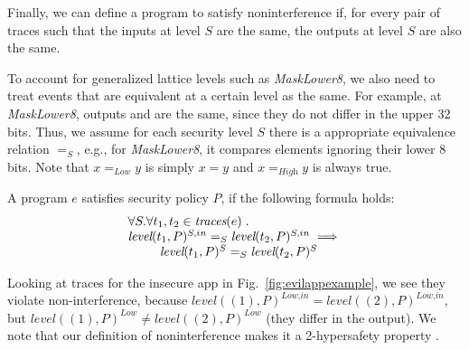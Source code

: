 \documentclass[10pt,conference,compsocconf]{IEEEtran}
\newcommand{\code}[1]{\text{\lstinline!#1!}}
\newcommand{\traces}{\textit{traces}}
\newcommand{\tr}{t\xspace}
\newcommand{\tset}{\ensuremath{\mathcal{T}}\xspace}
\newcommand{\tleveltr}[2]{\textit{level}(#1, #2)}
\begin{document}
Finally, we can define a program to satisfy noninterference if, for
every pair of traces such that the inputs at level $S$ are the same,
the outputs at level $S$ are also the same.

To account for generalized lattice levels such as \textit{MaskLower8},
we also need to treat events that are equivalent at a certain level as
the same. For example, at \textit{MaskLower8}, outputs
\code{0xffffffff} and \code{0xffffff00} are the same, since they do
not differ in the upper 32 bits. Thus, we assume for each security
level $S$ there is a appropriate equivalence relation $=_S$, e.g., for
\textit{MaskLower8}, it compares elements ignoring their lower 8
bits. Note that $x =_\textit{Low} y$ is simply $x = y$ and
$x =_\textit{High} y$ is always true.

\begin{definition}[Noninterference]
  \label{defn:noninterference}
  A program $e$ satisfies security policy $P$, if the following formula
  holds:
\begin{displaymath}
  \begin{array}{c}
    \multicolumn{1}{l}{\forall S. \forall t_1, t_2 \in
      \traces(e)\;.} \\
    \tleveltr{\tr_1}{P}^{S,in} =_S \tleveltr{\tr_2}{P}^{S,in}
    \implies \\
    ~~\tleveltr{\tr_1}{P}^S =_S \tleveltr{\tr_2}{P}^S  \\
  \end{array}
\end{displaymath}
\end{definition}

Looking at traces for the insecure app in Fig.~\ref{fig:evilappexample},
we see they violate non-interference, because 
$\tleveltr{(1)}{P}^\textit{Low,in} =
\tleveltr{(2)}{P}^\textit{Low,in}$,
but
$\tleveltr{(1)}{P}^\textit{Low} \neq \tleveltr{(2)}{P}^\textit{Low}$
(they differ in the output).  We note that our definition of
noninterference makes it a 2-hypersafety property \cite{Clarkson:10}.

  

\end{document}
